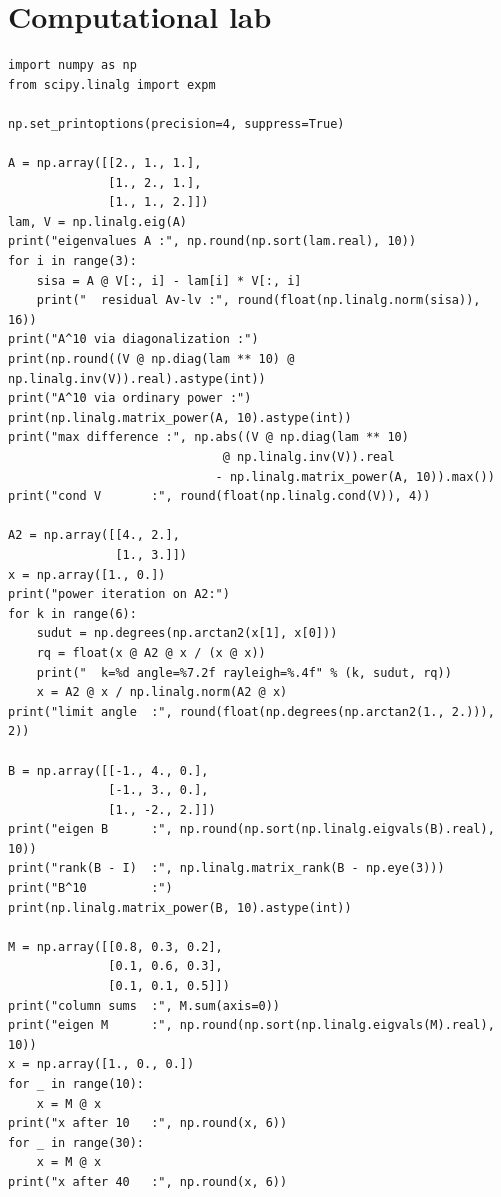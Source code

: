 
\section{Computational lab}

\begin{lab}
\begin{verbatim}
import numpy as np
from scipy.linalg import expm

np.set_printoptions(precision=4, suppress=True)

A = np.array([[2., 1., 1.],
              [1., 2., 1.],
              [1., 1., 2.]])
lam, V = np.linalg.eig(A)
print("eigenvalues A :", np.round(np.sort(lam.real), 10))
for i in range(3):
    sisa = A @ V[:, i] - lam[i] * V[:, i]
    print("  residual Av-lv :", round(float(np.linalg.norm(sisa)), 16))
print("A^10 via diagonalization :")
print(np.round((V @ np.diag(lam ** 10) @ np.linalg.inv(V)).real).astype(int))
print("A^10 via ordinary power :")
print(np.linalg.matrix_power(A, 10).astype(int))
print("max difference :", np.abs((V @ np.diag(lam ** 10)
                              @ np.linalg.inv(V)).real
                             - np.linalg.matrix_power(A, 10)).max())
print("cond V       :", round(float(np.linalg.cond(V)), 4))

A2 = np.array([[4., 2.],
               [1., 3.]])
x = np.array([1., 0.])
print("power iteration on A2:")
for k in range(6):
    sudut = np.degrees(np.arctan2(x[1], x[0]))
    rq = float(x @ A2 @ x / (x @ x))
    print("  k=%d angle=%7.2f rayleigh=%.4f" % (k, sudut, rq))
    x = A2 @ x / np.linalg.norm(A2 @ x)
print("limit angle  :", round(float(np.degrees(np.arctan2(1., 2.))), 2))

B = np.array([[-1., 4., 0.],
              [-1., 3., 0.],
              [1., -2., 2.]])
print("eigen B      :", np.round(np.sort(np.linalg.eigvals(B).real), 10))
print("rank(B - I)  :", np.linalg.matrix_rank(B - np.eye(3)))
print("B^10         :")
print(np.linalg.matrix_power(B, 10).astype(int))

M = np.array([[0.8, 0.3, 0.2],
              [0.1, 0.6, 0.3],
              [0.1, 0.1, 0.5]])
print("column sums  :", M.sum(axis=0))
print("eigen M      :", np.round(np.sort(np.linalg.eigvals(M).real), 10))
x = np.array([1., 0., 0.])
for _ in range(10):
    x = M @ x
print("x after 10   :", np.round(x, 6))
for _ in range(30):
    x = M @ x
print("x after 40   :", np.round(x, 6))


\end{verbatim}
\end{lab}
